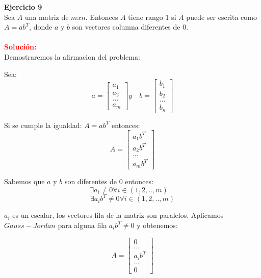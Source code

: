 \documentclass[12pt]{article}
\begin{document}
\noindent \textbf{Ejercicio 9} \\
Sea $A$ una matriz de $mxn$. Entonces $A$ tiene rango $1$ si $A$ puede ser escrita como $A=ab^{T}$, donde $a$ y $b$ son vectores columna diferentes de $0$.\\\\
\noindent \textcolor{red}{\bf Solución:}\\
Demostraremos la afirmacion del problema:

Sea:\\
$$a=\left[\begin{array}{c}
            a_{1}\\
            a_{2}\\
            ...\\
            a_{m}
            \end{array}\right]
y  \quad
b=\left[\begin{array}{c}
            b_{1}\\
            b_{2}\\
            ...\\
            b_{n}
            \end{array}\right]$$

Si se cumple la igualdad:  $A=ab^{T}$ entonces:\\
$$A=\left[\begin{array}{c}
            a_{1}b^{T}\\
            a_{2}b^{T}\\
            ...\\
            a_{m}b^{T}
            \end{array}\right]$$

Sabemos que $a$ y $b$ son diferentes de $0$ entonces:\\
$$\exists a_{i}\neq0 \forall i \in (1,2,..,m) \quad $$
$$\exists a_{i}b^{T}\neq0 \forall i \in (1,2,..,m)$$

$a_{i}$ es un escalar, los vectores fila de la matriz son paralelos. Aplicamos $Gauss-Jordan$ para alguna fila $a_{i}b^{T}\neq0 $ y obtenemos:

$$A=\left[\begin{array}{c}
            0\\
            ...\\
            a_{i}b^{T}\\
            ...\\
            0
            \end{array}\right]$$
            
\end{document}

